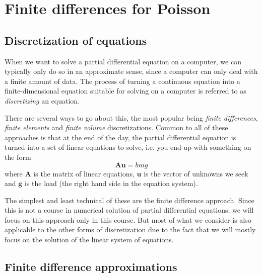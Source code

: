 \chapter{Finite differences for Poisson}

\section{Discretization of equations}

When we want to solve a partial differential equation on a computer, we can
typically only do so in an approximate sense, since a computer can only deal
with a finite amount of data. The process of turning a continuous equation into
a finite-dimensional equation suitable for solving on a computer is referred to
as \emph{discretizing} an equation.

There are several ways to go about this, the most popular being \emph{finite
differences}, \emph{finite elements} and \emph{finite volume} discretizations.
Common to all of these approaches is that at the end of the day, the partial
differential equation is turned into a set of linear equations to solve, i.e.
you end up with something on the form
\[
  \bm A \bm u = bm g
\]
where $\bm A$ is the matrix of linear equations, $\bm u$ is the vector of
unknowns we seek and $\bm g$ is the load (the right hand side in the equation
system).

The simplest and least technical of these are the finite difference approach.
Since this is not a course in numerical solution of partial differential
equations, we will focus on this approach only in this course. But most of what
we consider is also applicable to the other forms of discretization due to the
fact that we will mostly focus on the solution of the linear system of
equations.

\section{Finite difference approximations}

